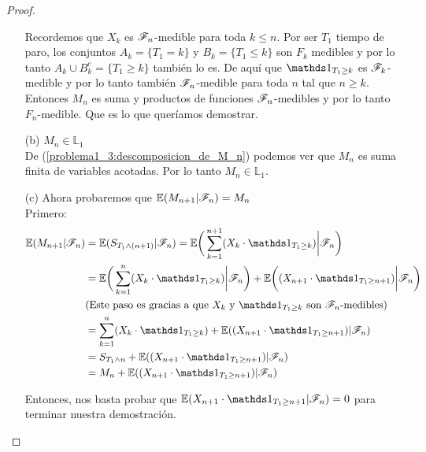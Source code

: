 \begin{proof}
\begin{itemize}
			 		Recordemos que $X_k$ es $\mathscr{F}_n$-medible para toda $k \leq n $. Por ser
			 		$T_1$ tiempo de paro, los conjuntos $A_k = \{T_1 = k\}$ y 
			 		$B_k = \{T_1 \leq k\}$	son $F_k$ medibles y por lo tanto 
			 		$A_k \cup B_k^c = \{ T_1 \geq k\}$ también lo es. De aquí que 
			 		$\indic_{T_1 \geq k}$ es $\mathscr{F}_k$-medible y por lo tanto también $\mathscr{F}_n$-medible
			 		para toda $n$ tal que $n \geq k$.\\
			 		  
			 		Entonces $M_n$ es suma y productos de funciones $\mathscr{F}_n$-medibles y por lo tanto
			 		$F_n$-medible. Que es lo que queríamos demostrar.\\
			 		
			 	\item[(b)]
			 		$M_n \in \mathbb{L}_1$\\
			 		
			 		De (\ref{problema1_3:descomposicion_de_M_n}) podemos ver que $M_n$ es 
			 		suma finita de variables acotadas. Por lo tanto $M_n \in \mathbb{L}_1$.\\
			 		
			 	\item[(c)] Ahora probaremos que	$\mathbb{E}(M_{n+1} | \mathscr{F}_{n}) = M_{n}$\\
			 		
			 		Primero:
			 		\begin{align}
			 			\E(M_{n+1} | \F_{n}) &= \E( S_{T_1 \wedge (n+1)} | \F_{n}) = 
			 			\E\bigg( \sum_{k=1}^{n+1} (X_k \cdot \indic_{T_1 \geq k})\bigg| \F_{n}\bigg) \\	 			
			 			& =\E\bigg( \sum_{k=1}^{n} (X_k \cdot \indic_{T_1 \geq k}) \bigg| \F_{n}\bigg) +
			 			\E\bigg((X_{n+1} \cdot \indic_{T_1 \geq n+1}) \bigg| \F_{n}\bigg) \\
			 			&\mbox{(Este paso es gracias a que $X_k$ y $\indic_{T_1 \geq k}$ son $\F_n$-medibles)}\\
			 			& = \sum_{k=1}^{n} (X_k \cdot \indic_{T_1 \geq k}) + 
			 			\E((X_{n+1} \cdot \indic_{T_1 \geq n+1}) | \F_{n}) \\
			 			& = S_{T_1 \wedge n} + \E((X_{n+1} \cdot \indic_{T_1 \geq n+1}) | \F_{n}) \\
			 			& = M_n + \E((X_{n+1} \cdot \indic_{T_1 \geq n+1}) | \F_{n})
			 		\end{align}
			 		
			 		Entonces, nos basta probar que $\E(X_{n+1} \cdot \indic_{T_1 \geq n+1} |
			 		 \F_{n}) = 0$ para terminar nuestra demostración.\\
			 		 

\end{itemize}
\end{proof}
